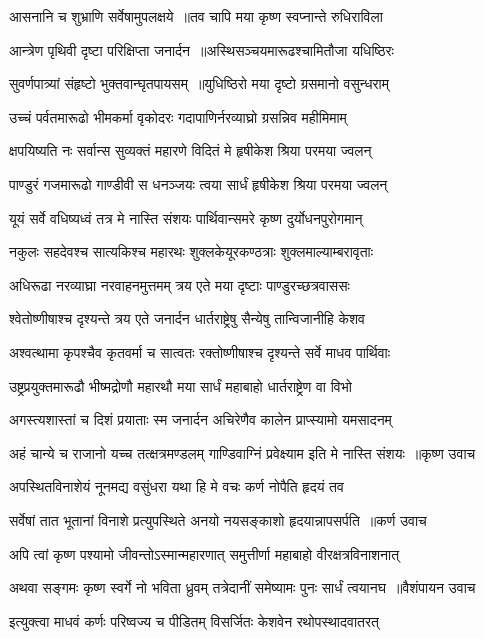 \twolineshloka
{आसनानि च शुभ्राणि सर्वेषामुपलक्षये ॥तव चापि मया कृष्ण स्वप्नान्ते रुधिराविला}
{}


\twolineshloka
{आन्त्रेण पृथिवी दृष्टा परिक्षिप्ता जनार्दन ॥अस्थिसञ्चयमारूढश्चामितौजा यधिष्ठिरः}
{}


\twolineshloka
{सुवर्णपात्र्यां संहृष्टो भुक्तवान्घृतपायसम् ॥युधिष्ठिरो मया दृष्टो ग्रसमानो वसुन्धराम्}
{}


\twolineshloka
{उच्चं पर्वतमारूढो भीमकर्मा वृकोदरः}
{गदापाणिर्नरव्याघ्रो ग्रसन्निव महीमिमाम्}


\twolineshloka
{क्षपयिष्यति नः सर्वान्स सुव्यक्तं महारणे}
{विदितं मे हृषीकेश श्रिया परमया ज्वलन्}


\twolineshloka
{पाण्डुरं गजमारूढो गाण्डीवी स धनञ्जयः}
{त्वया सार्धं हृषीकेश श्रिया परमया ज्वलन्}


\twolineshloka
{यूयं सर्वे वधिष्यध्वं तत्र मे नास्ति संशयः}
{पार्थिवान्समरे कृष्ण दुर्योधनपुरोगमान्}


\twolineshloka
{नकुलः सहदेवश्च सात्यकिश्च महारथः}
{शुक्लकेयूरकण्ठत्राः शुक्लमाल्याम्बरावृताः}


\twolineshloka
{अधिरूढा नरव्याघ्रा नरवाहनमुत्तमम्}
{त्रय एते मया दृष्टाः पाण्डुरच्छत्रवाससः}


\twolineshloka
{श्वेतोष्णीषाश्च दृश्यन्ते त्रय एते जनार्दन}
{धार्तराष्ट्रेषु सैन्येषु तान्विजानीहि केशव}


\twolineshloka
{अश्वत्थामा कृपश्चैव कृतवर्मा च सात्वतः}
{रक्तोष्णीषाश्च दृश्यन्ते सर्वे माधव पार्थिवाः}


\twolineshloka
{उष्ट्रप्रयुक्तमारूढौ भीष्मद्रोणौ महारथौ}
{मया सार्धं महाबाहो धार्तराष्ट्रेण वा विभो}


\twolineshloka
{अगस्त्यशास्तां च दिशं प्रयाताः स्म जनार्दन}
{अचिरेणैव कालेन प्राप्स्यामो यमसादनम्}


\threelineshloka
{अहं चान्ये च राजानो यच्च तत्क्षत्रमण्डलम्}
{गाण्डिवाग्निं प्रवेक्ष्याम इति मे नास्ति संशयः ॥कृष्ण उवाच}
{}


\twolineshloka
{अपस्थितविनाशेयं नूनमद्य वसुंधरा}
{यथा हि मे वचः कर्ण नोपैति हृदयं तव}


\threelineshloka
{सर्वेषां तात भूतानां विनाशे प्रत्युपस्थिते}
{अनयो नयसङ्काशो हृदयान्नापसर्पति ॥कर्ण उवाच}
{}


\twolineshloka
{अपि त्वां कृष्ण पश्यामो जीवन्तोऽस्मान्महारणात्}
{समुत्तीर्णा महाबाहो वीरक्षत्रविनाशनात्}


\threelineshloka
{अथवा सङ्गमः कृष्ण स्वर्गे नो भविता ध्रुवम्}
{तत्रेदानीं समेष्यामः पुनः सार्धं त्वयानघ ॥वैशंपायन उवाच}
{}


\twolineshloka
{इत्युक्त्वा माधवं कर्णः परिष्वज्य च पीडितम्}
{विसर्जितः केशवेन रथोपस्थादवातरत्}


